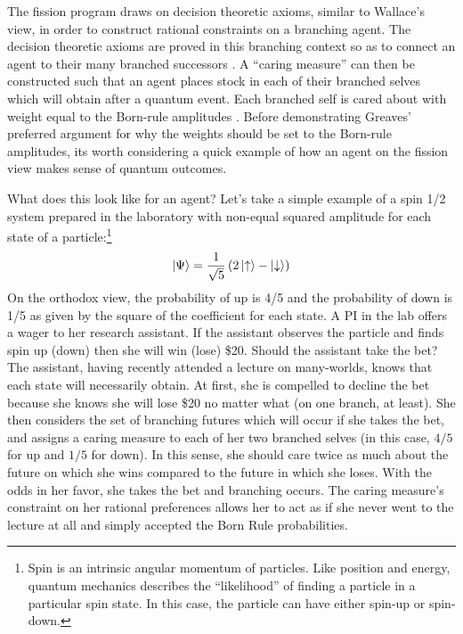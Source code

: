 \documentclass{article}
\begin{document}
The fission program draws on decision theoretic axioms, similar to Wallace's view, in order to construct rational constraints on a branching agent. 
The decision theoretic axioms are proved in this branching context so as to connect an agent to their many branched successors \parencite[18]{wallaceEpistemologyQuantizedCircumstances2006}. 
A ``caring measure'' can then be constructed such that an agent places stock in each of their branched selves which will obtain after a quantum event. Each branched self is cared about with weight equal to the Born-rule amplitudes \parencite[sec. 3.1.2]{greavesProbabilityEverettInterpretation2007}. Before demonstrating Greaves' preferred argument for why the weights should be set to the Born-rule amplitudes, its worth considering a quick example of how an agent on the fission view makes sense of quantum outcomes.

What does this look like for an agent? Let’s take a simple example of a spin 1/2 system prepared in the laboratory with non-equal squared amplitude for each state of a particle:\footnote{Spin is an intrinsic angular momentum of particles. Like position and energy, quantum mechanics describes the ``likelihood'' of finding a particle in a particular spin state. In this case, the particle can have either spin-up or spin-down.}
\begin{gather}
	\ket{\Psi} = \frac{1}{\sqrt{5}}\left(2\ket{\uparrow} - \ket{\downarrow}\right)
\end{gather}
On the orthodox view, the probability of up is 4/5 and the probability of down is 1/5 as given by the square of the coefficient for each state.
A PI in the lab offers a wager to her research assistant. If the assistant observes the particle and finds spin up (down) then she will win (lose) \$20. Should the assistant take the bet? The assistant, having recently attended a lecture on many-worlds, knows that each state will necessarily obtain. At first, she is compelled to decline the bet because she knows she will lose \$20 no matter what (on one branch, at least). She then considers the set of branching futures which will occur if she takes the bet, and assigns a caring measure to each of her two branched selves (in this case, $4/5$ for up and $1/5$ for down). In this sense, she should care twice as much about the future on which she wins compared to the future in which she loses. With the odds in her favor, she takes the bet and branching occurs. The caring measure’s constraint on her rational preferences allows her to act as if she never went to the lecture at all and simply accepted the Born Rule probabilities. 
\end{document}
